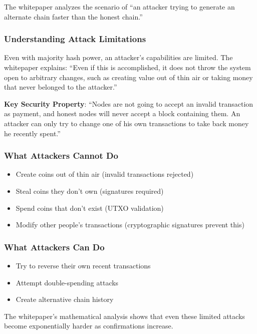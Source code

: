 The whitepaper analyzes the scenario of ``an attacker trying to generate an alternate chain faster than the honest chain.''

\subsubsection{Understanding Attack Limitations}

Even with majority hash power, an attacker's capabilities are limited. The whitepaper explains: ``Even if this is accomplished, it does not throw the system open to arbitrary changes, such as creating value out of thin air or taking money that never belonged to the attacker.''

\textbf{Key Security Property}: ``Nodes are not going to accept an invalid transaction as payment, and honest nodes will never accept a block containing them. An attacker can only try to change one of his own transactions to take back money he recently spent.''

\subsubsection{What Attackers Cannot Do}

\begin{itemize}
  \item Create coins out of thin air (invalid transactions rejected)
  \item Steal coins they don't own (signatures required)
  \item Spend coins that don't exist (UTXO validation)
  \item Modify other people's transactions (cryptographic signatures prevent this)
\end{itemize}

\subsubsection{What Attackers Can Do}

\begin{itemize}
  \item Try to reverse their own recent transactions
  \item Attempt double-spending attacks
  \item Create alternative chain history
\end{itemize}

The whitepaper's mathematical analysis shows that even these limited attacks become exponentially harder as confirmations increase.

